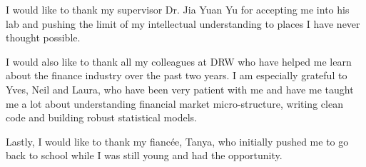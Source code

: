 \begin{acknowledgments}
  
  I would like to thank my supervisor Dr. Jia Yuan Yu for accepting me into his lab and pushing the limit of my intellectual understanding to places I have never thought possible. 
  
  I would also like to thank all my colleagues at DRW who have helped me learn about the finance industry over the past two years. I am especially grateful to Yves, Neil and Laura, who have been very patient with me and have me taught me a lot about understanding financial market micro-structure, writing clean code and building robust statistical models.
  
  Lastly, I would like to thank my fiancée, Tanya, who initially pushed me to go back to school while I was still young and had the opportunity. 
\end{acknowledgments}